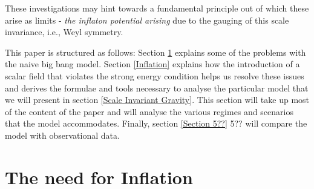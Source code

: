 \documentclass[aps,prd,reprint,preprintnumbers,showpacs,floatfix,nofootinbib,superscript address]{revtex4-2}
\begin{document}
These investigations may hint towards a fundamental principle out of which these arise as limits - \textit{the inflaton potential arising} due to the gauging of this scale invariance, i.e., Weyl symmetry.

This paper is structured as follows: Section \ref{The need for Inflation} explains some of the problems with the naive big bang model. Section \ref{Inflation} explains how the introduction of a scalar field that violates the strong energy condition helps us resolve these issues and derives the formulae and tools necessary to analyse the particular model that we will present in section \ref{Scale Invariant Gravity}. This section will take up most of the content of the paper and will analyse the various regimes and scenarios that the model accommodates. Finally, section \ref{Section 5??} 5?? will compare the model with observational data.


\section{The need for Inflation}\label{The need for Inflation}
\end{document}
